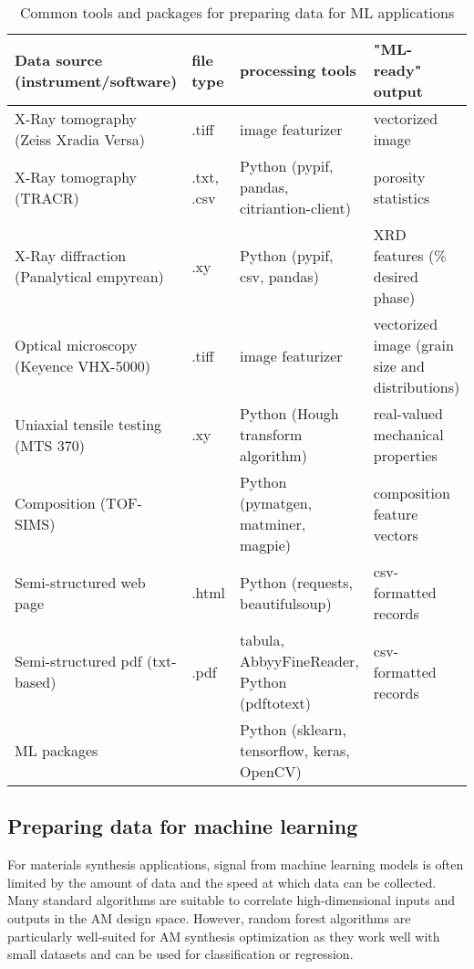 \begin{table*}
    \renewcommand{\arraystretch}{0.8}
    \setlength{\tabcolsep}{5pt}
    \begin{center}
        \begin{tabular}{@{}llll@{}}
            \toprule
            Data source (instrument/software) & file type & processing tools & "ML-ready" output \\ \midrule
            \hline
            \hline
            X-Ray tomography (Zeiss Xradia Versa) & .tiff & image featurizer & vectorized image \\
            X-Ray tomography (TRACR) & .txt, .csv & Python (pypif, pandas, citriantion-client) & porosity statistics \\
            X-Ray diffraction (Panalytical empyrean) & .xy & Python (pypif, csv, pandas) & XRD features (\% desired phase) \\
            Optical microscopy (Keyence VHX-5000) & .tiff & image featurizer & vectorized image (grain size and distributions) \\
            Uniaxial tensile testing (MTS 370) & .xy & Python (Hough transform algorithm) & real-valued mechanical properties \\
            Composition (TOF-SIMS) & & Python (pymatgen, matminer, magpie) & composition feature vectors \\
            Semi-structured web page & .html & Python (requests, beautifulsoup) & csv-formatted records \\
            Semi-structured pdf (txt-based) & .pdf & tabula, AbbyyFineReader, Python (pdftotext) & csv-formatted records \\
            ML packages & & Python (sklearn, tensorflow, keras, OpenCV) & \\
            \hline
            \bottomrule
        \end{tabular}
        \caption{Common tools and packages for preparing data for ML applications}
        \label{table:data_tools}
    \end{center}
\end{table*}


\subsection{Preparing data for machine learning}

For materials synthesis applications, signal from machine learning models is often limited by the amount of data and the speed at which data can be collected.
Many standard algorithms are suitable to correlate high-dimensional inputs and outputs in the AM design space.
However, random forest algorithms are particularly well-suited for AM synthesis optimization as they work well with small datasets and can be used for classification or regression.

